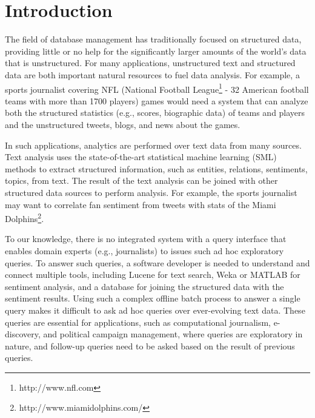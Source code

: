 
\section{Introduction}

The field of database management has traditionally focused on
structured data, providing little or no help for the significantly
larger amounts of the world's data that is unstructured. For many
applications, unstructured text and structured data are both
important natural resources to fuel data analysis. For example, a
sports journalist covering NFL (National Football
League\footnote{http://www.nfl.com} - 32 American football teams with
more than 1700 players) games would need a system that can analyze both the
structured statistics (e.g., scores, biographic data) of teams and players and the
unstructured tweets, blogs, and news about the games.

In such applications, analytics are performed over text data
from many sources. Text analysis uses the state-of-the-art
statistical machine learning (SML) methods to extract structured
information, such as entities, relations, sentiments, topics, from
text. The result of the text analysis can be joined with other
structured data sources to perform analysis. For example, the sports
journalist may want to correlate fan sentiment from tweets with stats
of the Miami Dolphins\footnote{http://www.miamidolphins.com/}.

To our knowledge, there is no integrated system with a query
interface that enables domain experts (e.g., journalists) to issues
such ad hoc exploratory queries. To answer such queries, a software
developer is needed to understand and connect multiple tools,
including Lucene for text search, Weka or MATLAB for sentiment
analysis, and a database for joining the structured data with the
sentiment results. Using such a complex offline batch process to 
answer a single query
makes it difficult to ask ad hoc queries over ever-evolving text data. 
These queries are essential for applications, such as computational journalism,
e-discovery, and political campaign management, where queries are
exploratory in nature, and follow-up queries need to be asked based
on the result of previous queries.


